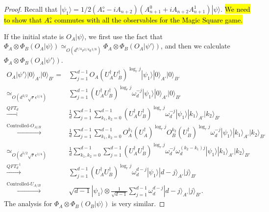 \documentclass[11pt,letterpaper]{article}
\newcommand{\ket}[1]{|#1\rangle}
\newcommand{\x}{\otimes}
\newcommand{\ct}{^{\dagger}}
\newcommand{\1}{\mathbb{1}}
\newcommand{\ep}{\epsilon}
\newcommand{\sr}{\sqrt{r}}
\newcommand{\appd}[1]{\simeq_{#1}}
\theoremstyle{definition}
\begin{document}
\begin{proof}
Recall that $\ket{\psi_1} =1/2 (A_\ast^\diamond - iA_{n+2})(A_{n+1}^0 + iA_{n+2}A_{n+1}^1) \ket{\psi}$.
\hl{We need to show that $A_\ast^\diamond$ commutes with all the observables for the Magic Square game.}

	
If the initial state is $O_A\ket{\psi}$, we first use the fact that 
$ \Phi_A \x \Phi_B (O_A\ket{\psi}) \appd{O(d^{7/4} r^{1/4} \ep^{1/8})}  \Phi_A \x \Phi_B (O_A\ket{\psi'})$, 
and then we calculate $\Phi_A \x \Phi_B (O_A\ket{\psi'})$.
\begin{align}
	O_A \ket{\psi'} \ket{0}_{A'}\ket{0}_{B'} =&  
		\sum_{j=1}^{d-1} O_A(U_A\ct U_B\ct)^{\log_r j}\ket{\psi_1}\ket{0}_{A'}\ket{0}_{B'}\\
		\appd{O(d^{3/2} \sr \ep^{1/4})}&\sum_{j=1}^{d-1}(U_A\ct U_B\ct)^{\log_r j} \omega_d^{-j} \ket{\psi_1} \ket{0}_{A'}\ket{0}_{B'}\\
		\xrightarrow[]{QFT_d} &\frac{1}{d}\sum_{j=1}^{d-1} \sum_{k_1,k_2 = 0}^{d-1}(U_A\ct U_B\ct)^{\log_r j} \omega_d^{-j} 
		\ket{\psi_1}\ket{k_1}_{A'}\ket{k_2}_{B'}\\
		\xrightarrow[]{\text{Controlled-}O_{A/B}}&\frac{1}{d}\sum_{j=1}^{d-1}\sum_{k_1,k_2 = 0}^{d-1} 
		 O_A^{k_1}(U_A\ct)^{\log_r j} O_B^{k_2}(U_B\ct)^{\log_r j} \omega_d^{-j} \ket{\psi_1} \ket{k_1}_{A'}\ket{k_2}_{B'}\\
		\appd{O(d^{5/2} \sr \ep^{1/4})}& \frac{1}{d}\sum_{k_1,k_2 = 0}^{d-1} \sum_{j=1}^{d-1} (U_A\ct U_B\ct)^{\log_r j}
		\omega_d^{-j}\omega_d^{(k_2-k_1)j}\ket{\psi_1}
		 \ket{k_1}_{A'}\ket{k_2}_{B'}\\
		\xrightarrow[]{QFT_d^{-1}}& \sum_{j=1}^{d-1}  (U_A\ct U_B\ct)^{\log_r j}  
		\omega_d^{d-j}\ket{\psi_1} \ket{d-j}_{A'}\ket{j}_{B'}\\
		\xrightarrow[]{\text{Controlled-}U_{A/B}}&   \sqrt{d-1} \ket{\psi_1} \x  
		\frac{1}{\sqrt{d-1}}\sum_{j=1}^{d-1} \omega_d^{d-j}\ket{d-j}_{A'}\ket{j}_{B'}.
\end{align}
The analysis for $\Phi_A\x\Phi_B(O_B \ket{\psi})$ is very similar.


\end{proof}
\end{document}
